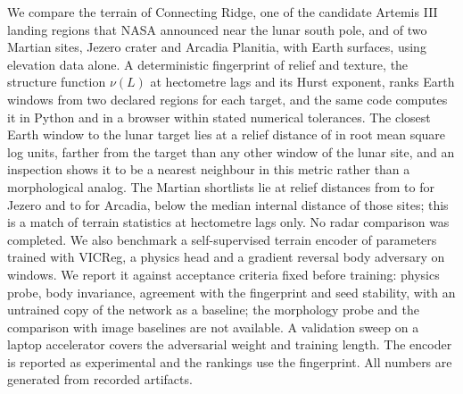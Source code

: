 We compare the terrain of Connecting Ridge, one of the candidate Artemis III landing regions
that NASA announced near the lunar south pole, and of two Martian sites, Jezero crater and Arcadia Planitia, with Earth surfaces, using
elevation data alone. A deterministic fingerprint of relief and texture, the structure function
$\nu(L)$ at hectometre lags and its Hurst exponent, ranks \ComparedCount{} Earth windows from two
declared regions for each target, and the same code computes it in Python and in a browser within
stated numerical tolerances. The closest Earth window to the lunar target lies at a relief distance
of \BestReliefDistance{} in root mean square log units, farther from the target than any other
window of the lunar site, and an inspection shows it to be a nearest neighbour in this metric rather
than a morphological analog. The Martian shortlists lie at relief distances from
\JezeroShortReliefMin{} to \JezeroShortReliefMax{} for Jezero and \ArcadiaShortReliefMin{} to
\ArcadiaShortReliefMax{} for Arcadia, below the median internal distance of those sites; this is
a match of terrain statistics at hectometre lags only. No radar comparison was completed. We also benchmark a self-supervised terrain encoder of \EncoderParams{}
parameters trained with VICReg, a physics head and a gradient reversal body adversary on
\DatasetWindows{} windows. We report it against acceptance criteria fixed before training: physics probe, body invariance,
agreement with the fingerprint and seed stability, with an untrained copy of the network as a
baseline; the morphology probe and the comparison with image baselines are not available. A
validation sweep on a laptop accelerator covers the adversarial weight and training length. The
encoder is reported as experimental and the rankings use the fingerprint. All numbers are generated from recorded artifacts.
